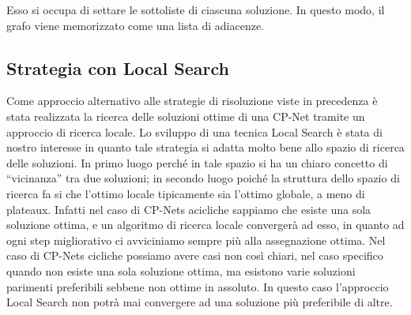 \documentclass[a4paper,titlepage]{article}
\begin{document}
Esso si occupa di settare le sottoliste di ciascuna 
soluzione. In questo modo, il grafo viene memorizzato come una lista di adiacenze.

\subsection{Strategia con Local Search}
Come approccio alternativo alle strategie di risoluzione viste in precedenza è stata realizzata la ricerca delle soluzioni ottime di una CP-Net tramite un approccio di ricerca locale. Lo sviluppo di una tecnica Local Search è stata di nostro interesse in quanto tale strategia si adatta molto bene allo spazio di ricerca delle soluzioni. In primo luogo perché in tale spazio si ha un chiaro concetto di ``vicinanza'' tra due soluzioni; in secondo luogo poiché la struttura dello spazio di ricerca fa si che l'ottimo locale tipicamente sia l'ottimo globale, a meno di plateaux. Infatti nel caso di CP-Nets acicliche sappiamo che esiste una sola soluzione ottima, e un algoritmo di ricerca locale convergerà ad esso, in quanto ad ogni step migliorativo ci avviciniamo sempre più alla assegnazione ottima. Nel caso di CP-Nets cicliche possiamo avere casi non così chiari, nel caso specifico quando non esiste una sola soluzione ottima, ma esistono varie soluzioni parimenti preferibili sebbene non ottime in assoluto. In questo caso l'approccio Local Search non potrà mai convergere ad una soluzione più preferibile di altre.
\end{document}
